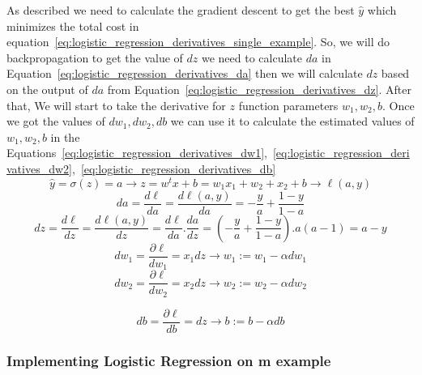   As described we need to calculate the gradient descent to get the best $\widehat{y}$ which minimizes the total cost in equation~\eqref{eq:logistic_regression_derivatives_single_example}. So, we will do backpropagation to get the value of $dz$ we need to calculate $da$ in Equation~\eqref{eq:logistic_regression_derivatives_da} then we will calculate $dz$ based on the output of $da$ from Equation~\eqref{eq:logistic_regression_derivatives_dz}. After that, We will start to take the derivative for $z$ function parameters \textbf{\textit{$w_1,w_2,b$}}. Once we got the values of \textbf{\textit{$dw_1,dw_2,db$}} we can use it to calculate the estimated values of \textbf{\textit{$w_1,w_2,b$}} in the Equations~\eqref{eq:logistic_regression_derivatives_dw1},~\eqref{eq:logistic_regression_derivatives_dw2},~\eqref{eq:logistic_regression_derivatives_db}%
\begin{equation}\label{eq:logistic_regression_derivatives_single_example}
    \boxed{\widehat{y} = \sigma(z) = a} \longrightarrow  \boxed{ z = w^tx + b = w_1x_1+ w_2+x_2+ b} \longrightarrow \boxed{\ell(a,y)}
  \end{equation}
  \begin{equation}\label{eq:logistic_regression_derivatives_da}
      \boxed{da =  \frac{d\ell}{da} = \frac{d\ell(a,y)}{da} = - \frac{y}{a} + \frac{1-y}{1-a}}
  \end{equation}
    \begin{equation}\label{eq:logistic_regression_derivatives_dz}
    \boxed{dz = \frac{d\ell}{dz} =  \frac{d\ell(a,y)}{dz} =  \frac{d\ell}{da} .  \frac{da}{dz}} = \boxed{(- \frac{y}{a} + \frac{1-y}{1-a}) . a(a-1) } = \boxed{ a - y    }
  \end{equation}
 \begin{equation}\label{eq:logistic_regression_derivatives_dw1}
      \boxed{dw_1 = \frac{\partial\ell}{dw_1} = x_1 dz} \longrightarrow \boxed{ w_1 := w_1 - \alpha dw_1}
  \end{equation}
    \begin{equation}\label{eq:logistic_regression_derivatives_dw2}
    \boxed{dw_2 = \frac{\partial\ell}{dw_2} = x_2 dz} \longrightarrow \boxed{ w_2 := w_2  - \alpha dw_2}
  \end{equation}


  \begin{equation}\label{eq:logistic_regression_derivatives_db}
    \boxed{db = \frac{\partial\ell}{db} =  dz} \longrightarrow \boxed{ b := b - \alpha db}
\end{equation}
 \subsubsection{Implementing Logistic Regression on m example}

